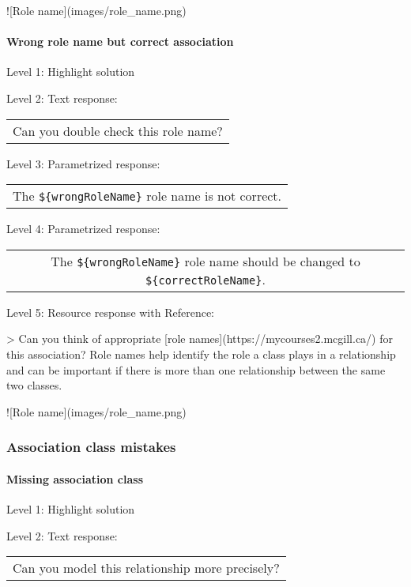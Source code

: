 ![Role name](images/role_name.png)



\paragraph{Wrong role name but correct association}

\noindent Level 1: Highlight solution \medskip

\noindent Level 2: Text response: \medskip

\begin{tabular}{|c}
Can you double check this role name?
\end{tabular} \medskip

\noindent Level 3: Parametrized response: \medskip

\begin{tabular}{|c}
The \verb|${wrongRoleName}| role name is not correct.
\end{tabular} \medskip

\noindent Level 4: Parametrized response: \medskip

\begin{tabular}{|c}
The \verb|${wrongRoleName}| role name should be changed to \verb|${correctRoleName}|.
\end{tabular} \medskip

\noindent Level 5: Resource response with Reference:

> Can you think of appropriate [role names](https://mycourses2.mcgill.ca/)
for this association? Role names help identify the role a class plays in a
relationship and can be important if there is more than one relationship
between the same two classes.

![Role name](images/role_name.png)



\subsubsection{Association class mistakes}

\paragraph{Missing association class}

\noindent Level 1: Highlight solution \medskip

\noindent Level 2: Text response: \medskip

\begin{tabular}{|c}
Can you model this relationship more precisely?
\end{tabular} \medskip

